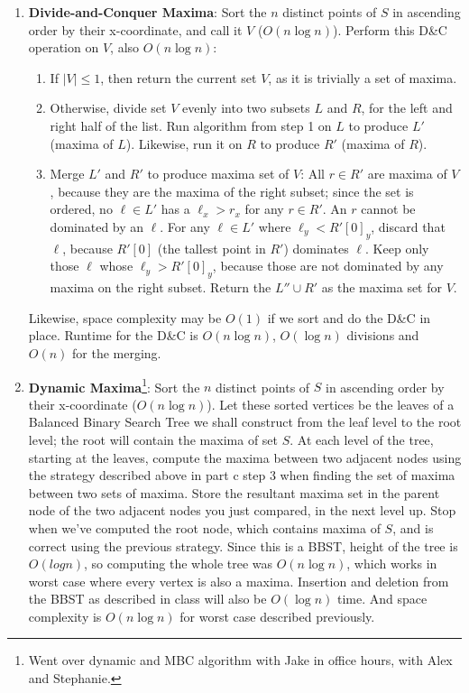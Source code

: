 \documentclass [12pt]{article}
\begin{document}
\begin{enumerate}[label=\alph*.]
            \item \textbf{Divide-and-Conquer Maxima}: Sort the $n$ distinct points of $S$ in ascending order by their x-coordinate, and call it $V$ ($O(n\log n)$). Perform this D\&C operation on $V$, also $O(n\log n)$:
                \begin{enumerate}[label=\arabic*)]
                    \item If $|V| \leq 1$, then return the current set $V$, as it is trivially a set of maxima.
                    \item Otherwise, divide set $V$ evenly into two subsets $L$ and $R$, for the left and right half of the list. Run algorithm from step 1 on $L$ to produce $L'$ (maxima of $L$). Likewise, run it on $R$ to produce $R'$ (maxima of $R$).
                    \item Merge $L'$ and $R'$ to produce maxima set of $V$: All $r \in R'$ are maxima of $V$, because they are the maxima of the right subset; since the set is ordered, no $\ell \in L'$ has a $\ell_x > r_x$ for any $r \in R'$. An $r$ cannot be dominated by an $\ell$. For any $\ell \in L'$ where $\ell_y < R'[0]_y$, discard that $\ell$, because $R'[0]$ (the tallest point in $R'$) dominates $\ell$. Keep only those $\ell$ whose $\ell_y > R'[0]_y$, because those are not dominated by any maxima on the right subset. Return the $L'' \cup R'$ as the maxima set for $V$. 
                \end{enumerate}
                Likewise, space complexity may be $O(1)$ if we sort and do the D\&C in place. Runtime for the D\&C is $O(n\log n)$, $O(\log n)$ divisions and $O(n)$ for the merging. 
            
            \item \textbf{Dynamic Maxima}\footnote{Went over dynamic and MBC algorithm with Jake in office hours, with Alex and Stephanie.}: Sort the $n$ distinct points of $S$ in ascending order by their x-coordinate ($O(n\log n)$). Let these sorted vertices be the leaves of a Balanced Binary Search Tree we shall construct from the leaf level to the root level; the root will contain the maxima of set $S$. At each level of the tree, starting at the leaves, compute the maxima between two adjacent nodes using the strategy described above in part c step 3 when finding the set of maxima between two sets of maxima. Store the resultant maxima set in the parent node of the two adjacent nodes you just compared, in the next level up. Stop when we've computed the root node, which contains maxima of $S$, and is correct using the previous strategy. Since this is a BBST, height of the tree is $O(log n)$, so computing the whole tree was $O(n\log n)$, which works in worst case where every vertex is also a maxima. Insertion and deletion from the BBST as described in class will also be $O(\log n)$ time. And space complexity is $O(n\log n)$ for worst case described previously. 
            

\end{enumerate}
\end{document}
